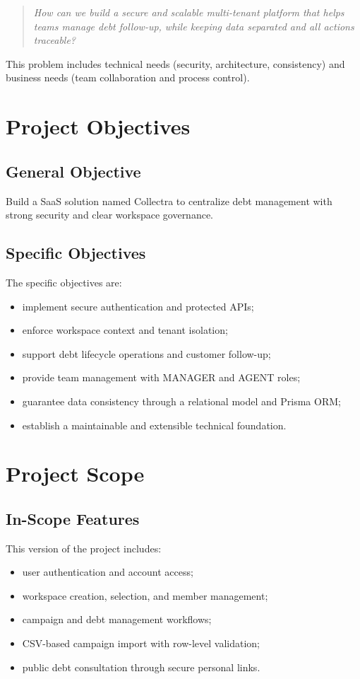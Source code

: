 \documentclass[12pt,a4paper]{report}
\begin{document}
\begin{quote}
\textit{How can we build a secure and scalable multi-tenant platform that helps teams manage debt follow-up, while keeping data separated and all actions traceable?}
\end{quote}

This problem includes technical needs (security, architecture, consistency) and business needs (team collaboration and process control).

\section{Project Objectives}
\subsection{General Objective}
Build a SaaS solution named Collectra to centralize debt management with strong security and clear workspace governance.

\subsection{Specific Objectives}
The specific objectives are:
\begin{itemize}
  \item implement secure authentication and protected APIs;
  \item enforce workspace context and tenant isolation;
  \item support debt lifecycle operations and customer follow-up;
  \item provide team management with MANAGER and AGENT roles;
  \item guarantee data consistency through a relational model and Prisma ORM;
  \item establish a maintainable and extensible technical foundation.
\end{itemize}

\section{Project Scope}
\subsection{In-Scope Features}
This version of the project includes:
\begin{itemize}
  \item user authentication and account access;
  \item workspace creation, selection, and member management;
  \item campaign and debt management workflows;
  \item CSV-based campaign import with row-level validation;
  \item public debt consultation through secure personal links.
\end{itemize}
\end{document}
